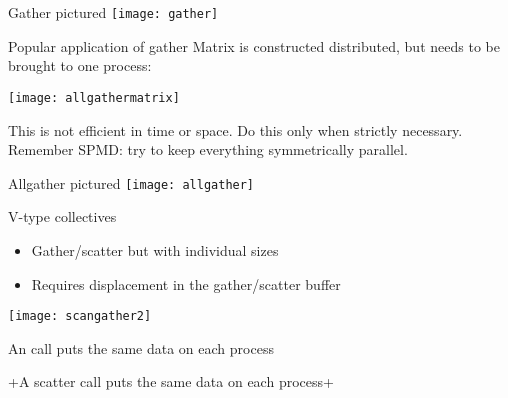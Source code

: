 \begin{numberedframe}{Gather pictured}
  \texttt{[image: gather]}
\end{numberedframe}

\begin{numberedframe}{Popular application of gather}
  Matrix is constructed distributed, but needs to be brought to one
  process:
  
  \texttt{[image: allgathermatrix]}

  This is not efficient in time or space. Do this
  only when strictly necessary. Remember SPMD: try to keep everything
  symmetrically parallel. 
\end{numberedframe}

\begin{mpl}
  \addtocounter{slidecount}{-1}
\end{mpl}

\begin{numberedframe}{Allgather pictured}
  \texttt{[image: allgather]}
\end{numberedframe}

\begin{numberedframe}{V-type collectives}
  \begin{itemize}
  \item Gather/scatter but with individual sizes
  \item Requires displacement in the gather/scatter buffer
  \end{itemize}
\end{numberedframe}

\begin{mpl}
  \addtocounter{slidecount}{-1}
\end{mpl}

\begin{exerciseframe}[scangather]
  
\end{exerciseframe}

\begin{exerciseframe}[scangather]
  
  \texttt{[image: scangather2]}
\end{exerciseframe}

\begin{reviewframe}
  An  call puts the same data on each process
  
  \slackpollTF+A scatter call puts the same data on each process+
\end{reviewframe}

